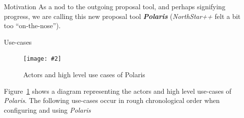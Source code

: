 \documentclass[final]{beamer}
\newlength{\colwidth}
\newcommand{\insertFigure}[3][width=1.0\textwidth]{%
    \begin{figure}[ht]
    \centering
    \texttt{[image: \#2]}
    \caption{#3}
    \label{fig:#2}
    \end{figure}
}
\begin{document}
\begin{frame}[t]
\begin{columns}[t]
\begin{column}{\colwidth}
\begin{block}{Motivation}
                    As a nod to the outgoing proposal tool, and perhaps signifying progress, we are calling this new
                    proposal tool \textbf{\emph{Polaris}} (\emph{NorthStar++} felt a bit too ``on-the-nose'').

                \end{block}

                \begin{block}{Use-cases}

                    \insertFigure[width=38cm,height=40cm]{use-cases}{Actors and high level use cases of Polaris}

                    Figure~\ref{fig:use-cases} shows a diagram representing the actors and high level use-cases of
                    \emph{Polaris}.
                    The following use-cases occur in rough chronological order when configuring and using \emph{Polaris}


\end{block}
\end{column}
\end{columns}
\end{frame}
\end{document}
